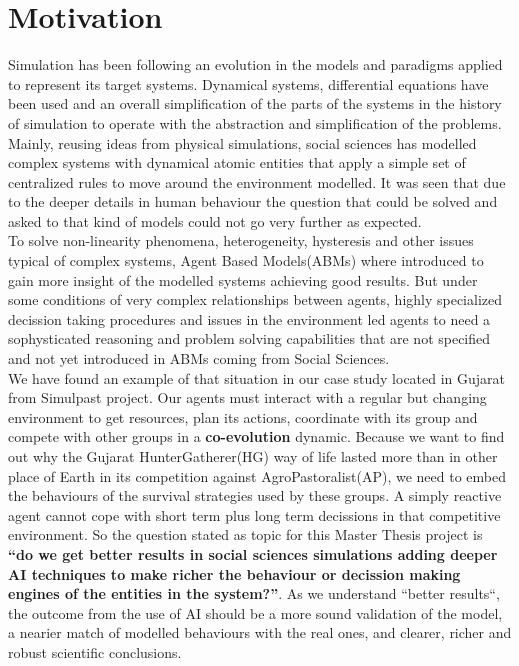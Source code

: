 \documentclass[11pt,oneside,a4paper,openright]{report}
\begin{document}

\section{Motivation}

Simulation has been following an evolution in the models and paradigms applied to represent its target
systems. Dynamical systems, differential equations have been used and an overall simplification of the parts of the systems in the history of simulation to operate with the abstraction and simplification of the problems.
Mainly, reusing ideas from physical simulations, social sciences has modelled complex systems with dynamical
atomic entities that apply a simple set of centralized rules to move around the environment modelled. It was seen that due to the deeper details in human behaviour the question that could be solved and asked to that kind of models could not go very further as expected.\\ 

To solve non-linearity phenomena, heterogeneity, hysteresis\cite[p.571–597]{hysteresisDef} and other issues typical of complex systems, Agent Based Models(ABMs) where introduced to gain more insight of the modelled systems achieving good results. But under 
some conditions of very complex relationships between agents, highly specialized decission taking procedures
and issues in the environment led agents to need a sophysticated reasoning and problem solving capabilities
that are not specified and not yet introduced in ABMs coming from Social Sciences.\\ 

We have found an example of that situation in our case study located in Gujarat from Simulpast project. Our agents must interact with a regular but changing environment to get resources, plan its actions, coordinate with its group and compete with other groups in a \textbf{co-evolution} dynamic. Because we want to find out why the Gujarat HunterGatherer(HG) way of life lasted more than in other place of Earth in its competition against AgroPastoralist(AP), we need to embed the behaviours of the survival strategies used by these groups. A simply reactive agent cannot cope with short term plus long term decissions in that competitive environment. So the question stated as topic for this Master Thesis project is \textbf{``do we get better results in social sciences simulations adding deeper AI techniques to make richer the behaviour or decission making engines of the entities in the system?''}. As we understand ``better results``, the outcome from the use of AI should be a more sound validation of the model, a nearier match of modelled behaviours with the real ones, and clearer, richer and robust scientific conclusions.\\
\end{document}
